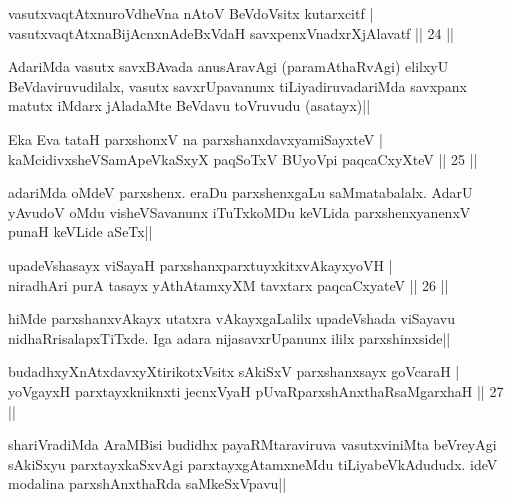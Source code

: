 
\begin{shl}
vasutxvaqtAtxnuroVdheVna nAtoV BeVdoV\s sitx kutarxcitf |\\
vasutxvaqtAtxnaBijAcnxnAdeBxVdaH savxpenxVnadxrXjAlavatf \hfill || 24 ||
\end{shl}

\begin{artha}
AdariMda vasutx savxBAvada anusAravAgi (paramAthaRvAgi) elilxyU BeVdaviruvudilalx, vasutx savxrUpavanunx tiLiyadiruvadariMda savxpanx matutx iMdarx jAladaMte BeVdavu toVruvudu (asatayx)||
\end{artha}

\begin{shl}
Eka Eva tataH parxshonxV na parxshanxdavxyamiSayxteV |\\
kaMcidivxsheVSamApeVkaSxyX paqSoTxV BUyoV\s pi paqcaCxyXteV \hfill || 25 ||
\end{shl}

\begin{artha}
adariMda oMdeV parxshenx. eraDu parxshenxgaLu saMmatabalalx. AdarU yAvudoV oMdu visheVSavanunx iTuTxkoMDu keVLida parxshenxyanenxV punaH keVLide aSeTx||
\end{artha}%

\begin{shl}
upadeVshasayx viSayaH parxshanxparxtuyxkitxvAkayxyoVH |\\
niradhAri purA tasayx yAthAtamxyXM tavxtarx paqcaCxyateV \hfill || 26 ||
\end{shl}

\begin{artha}
hiMde parxshanxvAkayx utatxra vAkayxgaLalilx upadeVshada viSayavu nidhaRrisalapxTiTxde. Iga adara nijasavxrUpanunx ililx parxshinxside||
\end{artha}


\begin{shl}
budadhxyXnAtxdavxyXtirikotxV\s sitx sAkiSxV parxshanxsayx goVcaraH |\\
yoVgayxH parxtayxkniknxti jecnxVyaH pUvaRparxshAnxthaRsaMgarxhaH \hfill || 27 ||
\end{shl}

\begin{artha}
shariVradiMda AraMBisi budidhx payaRMtaraviruva vasutxviniMta beVreyAgi sAkiSxyu parxtayxkaSxvAgi parxtayxgAtamxneMdu tiLiyabeVkAdududx. ideV modalina parxshAnxthaRda saMkeSxVpavu||
\end{artha}

